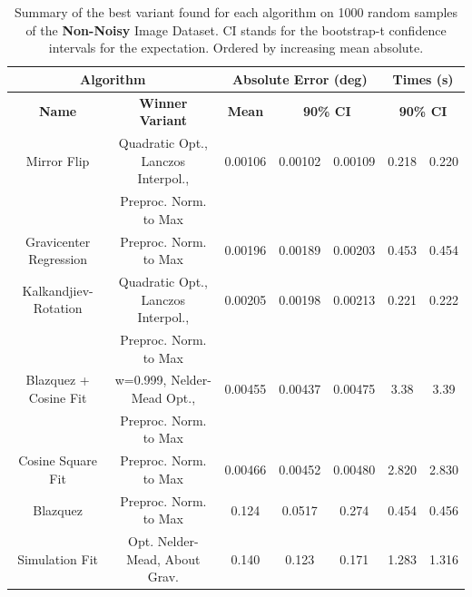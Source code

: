 \documentclass[11pt, a4paper, twoside]{article} %
\begin{document}
\begin{table}[h!]
\caption{Summary of the best variant found for each algorithm on 1000 random samples of the {\bf Non-Noisy} Image Dataset. CI stands for the bootstrap-t confidence intervals for the expectation. Ordered by increasing mean absolute.}\label{tab:nonnoisy}
\hspace{-0.6cm}\begin{tabular}{c|c|c|cc|cc}
\toprule
\multicolumn{2}{c|}{\bf Algorithm} &  \multicolumn{3}{|c|}{\bf Absolute Error (deg)} & \multicolumn{2}{|c}{\bf Times (s)} \\ \midrule \midrule
{\bf                     Name} &                          {\bf Winner} {\bf Variant} &  {\bf Mean} &  \multicolumn{2}{c|}{\bf 90\% CI } &  \multicolumn{2}{|c}{\bf 90\% CI }\\
\bottomrule\rule{0pt}{4mm}{}
           Mirror Flip & Quadratic Opt., Lanczos Interpol.,  & 0.00106 &    0.00102 &   0.00109 &        0.218 &       0.220 \\
                       &               Preproc. Norm. to Max &         &            &           &              &             \\ \hline\rule{0pt}{4mm}{}
Gravicenter Regression &               Preproc. Norm. to Max & 0.00196 &    0.00189 &   0.00203 &        0.453 &       0.454 \\ \hline\rule{0pt}{4mm}{}
  Kalkandjiev-Rotation &  Quadratic Opt., Lanczos Interpol., & 0.00205 &    0.00198 &   0.00213 &        0.221 &       0.222 \\
                       &               Preproc. Norm. to Max &         &            &           &              &             \\ \hline\rule{0pt}{4mm}{}
 Blazquez + Cosine Fit &         w=0.999, Nelder-Mead Opt.,  & 0.00455 &    0.00437 &   0.00475 &        3.38 &       3.39 \\
                       &               Preproc. Norm. to Max &         &            &           &              &             \\ \hline\rule{0pt}{4mm}{}
     Cosine Square Fit &               Preproc. Norm. to Max & 0.00466 &    0.00452 &   0.00480 &        2.820 &       2.830 \\ \hline\rule{0pt}{4mm}{}
              Blazquez &               Preproc. Norm. to Max & 0.124 &    0.0517 &   0.274 &        0.454 &       0.456 \\ \hline\rule{0pt}{4mm}{}
              Simulation Fit	& Opt. Nelder-Mead, About Grav.&	0.140	 & 0.123	& 0.171&	1.283	&1.316\\ 

\end{tabular}
\end{table}
\end{document}
